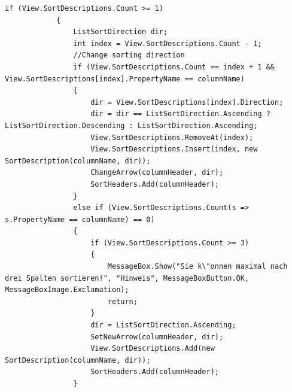 \begin{lstlisting}
if (View.SortDescriptions.Count >= 1)
            {
                ListSortDirection dir;
                int index = View.SortDescriptions.Count - 1;
                //Change sorting direction
                if (View.SortDescriptions.Count == index + 1 && View.SortDescriptions[index].PropertyName == columnName)
                {
                    dir = View.SortDescriptions[index].Direction;
                    dir = dir == ListSortDirection.Ascending ? ListSortDirection.Descending : ListSortDirection.Ascending;
                    View.SortDescriptions.RemoveAt(index);
                    View.SortDescriptions.Insert(index, new SortDescription(columnName, dir));
                    ChangeArrow(columnHeader, dir);
                    SortHeaders.Add(columnHeader);
                }
                else if (View.SortDescriptions.Count(s => s.PropertyName == columnName) == 0)
                {
                    if (View.SortDescriptions.Count >= 3)
                    {
                        MessageBox.Show("Sie k\"onnen maximal nach drei Spalten sortieren!", "Hinweis", MessageBoxButton.OK, MessageBoxImage.Exclamation);
                        return;
                    }
                    dir = ListSortDirection.Ascending;
                    SetNewArrow(columnHeader, dir);
                    View.SortDescriptions.Add(new SortDescription(columnName, dir));
                    SortHeaders.Add(columnHeader);
                }
\end{lstlisting}
